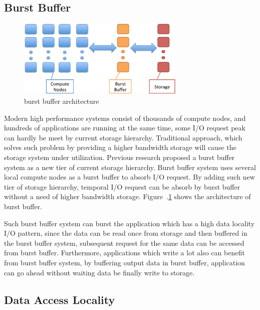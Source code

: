 \subsection{Burst Buffer}
\begin{figure}
\centering
\includegraphics[width=8cm]{img/burst_buffer.pdf}
\caption{burst buffer architecture}
\label{background:burst buffer architecture}
\end{figure}

Modern high performance systems consist of thousands of compute nodes, and hundreds of
applications are running at the same time, some I/O request peak can hardly be meet by current
storage hierarchy. 
Traditional approach, which solves such problem by providing a higher bandwidth storage will cause
the storage system under utilization.
Previous research\cite{on_the_role_of_burst_buffers} proposed a
burst buffer system as a new tier of current storage hierarchy.
Burst buffer system uses several local compute nodes as a burst buffer to absorb I/O
request. 
By adding such new tier of storage hierarchy, temporal I/O request can be absorb by burst buffer
without a need of higher bandwidth storage. Figure~.\ref{background:burst buffer architecture}
shows the architecture of burst buffer.

Such burst buffer system can burst the application which has a high data locality I/O pattern, since
the data can be read once from storage and then buffered in the burst buffer system, subsequent
request for the same data can be accessed from burst buffer.
Furthermore, applications which write a lot also can benefit from burst buffer system, by buffering
output data in burst buffer, application can go ahead without waiting data be finally write to
storage.

\subsection{Data Access Locality}

